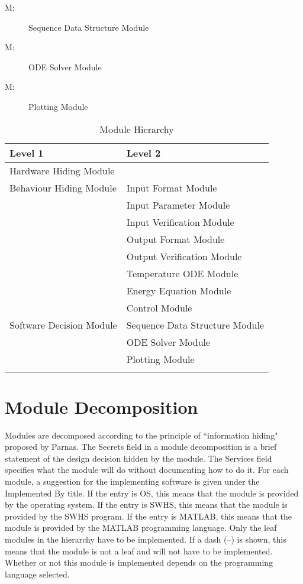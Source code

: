 \documentclass[12pt]{article}
\newcounter{modnum}
\newcommand{\mthemodnum}{M\themodnum}
\begin{document}
\begin{description}
\item[\mthemodnum\label{Mmodseqserv}:]Sequence Data Structure Module
\end{description}
\begin{description}
\item[\mthemodnum\label{Mmododedesc}:]ODE Solver Module
\end{description}
\begin{description}
\item[\mthemodnum\label{Mmodplotdesc}:]Plotting Module
\end{description}
\begin{longtable}{l l}
\toprule
Level 1 & Level 2
\\
\midrule
Hardware Hiding Module & 
\\
Behaviour Hiding Module & Input Format Module
\\
 & Input Parameter Module
\\
 & Input Verification Module
\\
 & Output Format Module
\\
 & Output Verification Module
\\
 & Temperature ODE Module
\\
 & Energy Equation Module
\\
 & Control Module
\\
Software Decision Module & Sequence Data Structure Module
\\
 & ODE Solver Module
\\
 & Plotting Module
\\
\bottomrule
\caption{Module Hierarchy}
\label{Table:ModuHier}
\end{longtable}
\section{Module Decomposition}
\label{Sec:ModuDeco}
Modules are decomposed according to the principle of ``information hiding" proposed by Parnas. The Secrets field in a module decomposition is a brief statement of the design decision hidden by the module. The Services field specifies what the module will do without documenting how to do it. For each module, a suggestion for the implementing software is given under the Implemented By title. If the entry is OS, this means that the module is provided by the operating system. If the entry is SWHS, this means that the module is provided by the SWHS program. If the entry is MATLAB, this means that the module is provided by the MATLAB programming language. Only the leaf modules in the hierarchy have to be implemented. If a dash (--) is shown, this means that the module is not a leaf and will not have to be implemented. Whether or not this module is implemented depends on the programming language selected.
\end{document}
